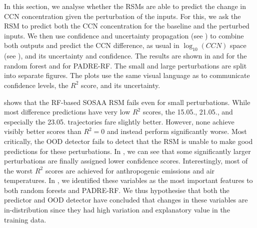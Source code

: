 In this section, we analyse whether the RSMs are able to predict the change in CCN concentration given the perturbation of the inputs. For this, we ask the RSM to predict both the CCN concentration for the baseline and the perturbed inputs. We then use confidence and uncertainty propagation (see ) to combine both outputs and predict the CCN difference, as usual in $\log_{10}(CCN)$ space (see ), and its uncertainty and confidence. The results are shown in  and  for the random forest and  for PADRE-RF. The small and large perturbations are split into separate figures. The plots use the same visual language as  to communicate confidence levels, the $R^2$ score, and its uncertainty.

\newpar {} shows that the RF-based SOSAA RSM fails even for small perturbations. While most difference predictions have very low $R^2$ scores, the 15.05., 21.05., and especially the 23.05. trajectories fare slightly better. However, none achieve visibly better scores than $R^2 = 0$ and instead perform significantly worse. Most critically, the OOD detector fails to detect that the RSM is unable to make good predictions for these perturbations. In , we can see that some significantly larger perturbations are finally assigned lower confidence scores. Interestingly, most of the worst $R^2$ scores are achieved for anthropogenic emissions and air temperatures. In , we identified these variables as the most important features to both random forests and PADRE-RF. We thus hypothesise that both the predictor and OOD detector have concluded that changes in these variables are in-distribution since they had high variation and explanatory value in the training data.

